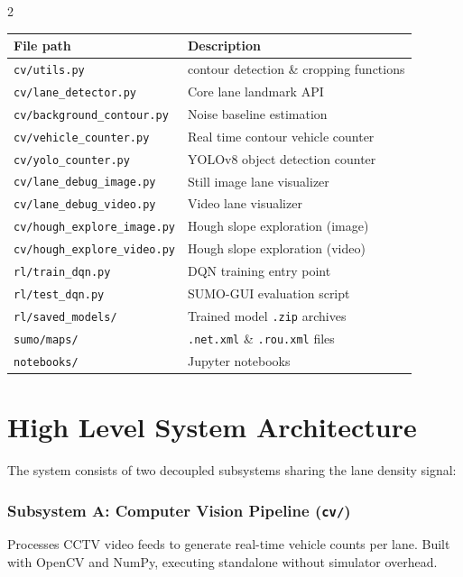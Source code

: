 \documentclass[10pt, a4paper]{article}
\begin{document}
\begin{multicols}{2}
\begin{center}
\scriptsize
\begin{tabular}{@{}p{3.5cm} p{4.3cm}@{}}
\toprule
\textbf{File path} & \textbf{Description} \\
\midrule
\texttt{cv/utils.py}
  & contour detection \& cropping functions \\
\texttt{cv/lane\_detector.py}
  & Core lane landmark API \\
\texttt{cv/background\_contour.py}
  & Noise baseline estimation \\
\texttt{cv/vehicle\_counter.py}
  & Real time contour vehicle counter \\
\texttt{cv/yolo\_counter.py}
  & YOLOv8 object detection counter \\
\texttt{cv/lane\_debug\_image.py}
  & Still image lane visualizer \\
\texttt{cv/lane\_debug\_video.py}
  & Video lane visualizer \\
\texttt{cv/hough\_explore\_image.py}
  & Hough slope exploration (image) \\
\texttt{cv/hough\_explore\_video.py}
  & Hough slope exploration (video) \\
\texttt{rl/train\_dqn.py}
  & DQN training entry point \\
\texttt{rl/test\_dqn.py}
  & SUMO-GUI evaluation script \\
\texttt{rl/saved\_models/}
  & Trained model \texttt{.zip} archives \\
\texttt{sumo/maps/}
  & \texttt{.net.xml} \& \texttt{.rou.xml} files \\
\texttt{notebooks/}
  & Jupyter notebooks \\
\bottomrule
\end{tabular}
\end{center}

\section{High Level System Architecture}

The system consists of two decoupled subsystems sharing the lane density
signal:

\subsubsection{Subsystem A: Computer Vision Pipeline (\texttt{cv/})}
Processes CCTV video feeds to generate real-time vehicle counts per lane.
Built with OpenCV and NumPy, executing standalone without simulator overhead.


\end{multicols}
\end{document}
